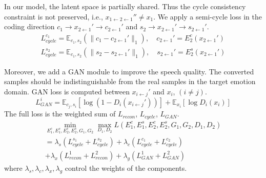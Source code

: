 \documentclass{article}
\begin{document}
In our model, the latent space is partially shared. Thus the cycle consistency constraint \cite{Zhu_2017_ICCV} is not preserved, i.e., $x_{1\leftarrow2\leftarrow1}'' \neq x_1$. We apply a semi-cycle loss in the coding direction $c_1 \rightarrow x_{2\leftarrow1}' \rightarrow c_{2\leftarrow1}'$ and $s_2 \rightarrow x_{2\leftarrow1}' \rightarrow s_{2\leftarrow1}'$.
\begin{equation}
\begin{aligned}
L_{cycle}^{c_1} = \mathbb{E}_{c_1, s_2} (\| c_1 - c_{2\leftarrow1}' \|_1), \quad c_{2\leftarrow1}'=E_2^c(x_{2\leftarrow1}') \\
L_{cycle}^{s_2} = \mathbb{E}_{c_1, s_2} (\| s_2 - s_{2\leftarrow1}' \|_1), \quad s_{2\leftarrow1}'=E_2^s(x_{2\leftarrow1}')
\end{aligned}
\end{equation}

Moreover, we add a GAN module to improve the speech quality. The converted samples should be indistinguishable from the real samples in the target emotion domain. GAN loss is computed between $x_{i\leftarrow j}'$ and $x_i$, $(i \neq j)$.
\begin{equation}
L_{GAN}^i = \mathbb{E}_{c_j, s_i}[\log(1-D_i(x_{i\leftarrow j}'))] + \mathbb{E}_{x_i}[\log D_i(x_i)]
\end{equation}
The full loss is the weighted sum of $L_{recon}$, $L_{cycle}$, $L_{GAN}$.
\begin{equation}
\begin{aligned}
\min_{E_1^c,E_1^s,E_2^c,E_2^s, G_1,G_2}\max_{D_1,D_2} L(E_1^c, E_1^s, E_2^c, E_2^s, G_1, G_2, D_1, D_2) \\
= \lambda_s (L_{cycle}^{s_1} + L_{cycle}^{s_2}) + \lambda_c (L_{cycle}^{c_1} + L_{cycle}^{c_2}) \ \qquad \qquad \\
+ \lambda_x (L_{recon}^1 + L_{recon}^2) + \lambda_g (L_{GAN}^1 + L_{GAN}^2) \qquad \quad
\end{aligned}
\end{equation}
where $\lambda_s, \lambda_c, \lambda_x, \lambda_g$ control the weights of the components.
%
%


\end{document}
